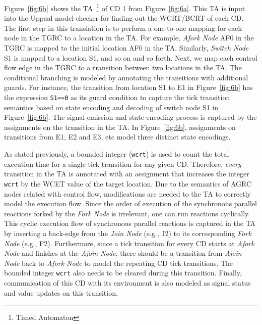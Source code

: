 Figure~\ref{fig:6b} shows the TA~\footnote{Timed Automaton} of CD 1 from
Figure~\ref{fig:6a}. This TA is input into the Uppaal model-checker for
finding out the WCRT/BCRT of each CD. The first step in this translation
is to perform a one-to-one mapping for each node in the TGRC to a
location in the TA. For example, \textit{Afork Node} AF0 in the TGRC is
mapped to the initial location AF0 in the TA. Similarly, \textit{Switch
  Node} S1 is mapped to a location S1, and so on and so forth. Next, we
map each control flow edge in the TGRC to a transition between two
locations in the TA. The conditional branching is modeled by annotating
the transitions with additional guards. For instance, the transition
from location S1 to E1 in Figure~\ref{fig:6b} has the expression
\texttt{S1==0} as its guard condition to capture the tick transition
semantics based on state encoding and decoding of switch node S1 in
Figure~\ref{fig:6b}. The signal emission and state encoding process is
captured by the assignments on the transition in the TA. In
Figure~\ref{fig:6b}, assignments on transitions from E1, E2 and E3, etc
model three distinct state encodings.

As stated previously, a bounded integer (\texttt{wcrt}) is used to count
the total execution time for a single tick transition for any given
CD. Therefore, \textit{every} transition in the TA is annotated with an
assignment that increases the integer \texttt{wcrt} by the WCET value of
the target location. Due to the semantics of AGRC nodes related with
control flow, modifications are needed to the TA to correctly model the
execution flow. Since the order of execution of the synchronous parallel
reactions forked by the \textit{Fork Node} is irrelevant, one can run
reactions cyclically. This cyclic execution flow of synchronous parallel
reactions is captured in the TA by inserting a back-edge from the
\textit{Join Node} (e.g., J2) to its corresponding \textit{Fork Node}
(e.g., F2). Furthermore, since a tick transition for every CD starts at
\textit{Afork Node} and finishes at the \textit{Ajoin Node}, there
should be a transition from \textit{Ajoin Node} back to \textit{Afork
  Node} to model the repeating CD tick transitions. The bounded integer
\texttt{wcrt} also needs to be cleared during this transition. Finally,
communication of this CD with its environment is also modeled as signal
status and value updates on this transition.

